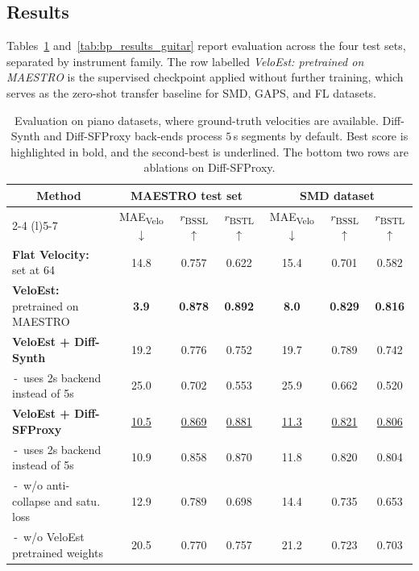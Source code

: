 \subsection{Results}
\label{ssec:bp:adapt_results}

Tables~\ref{tab:bp_results_piano} and~\ref{tab:bp_results_guitar} report evaluation across the four test sets, separated by instrument family. The row labelled \textit{VeloEst: pretrained on MAESTRO} is the supervised checkpoint applied without further training, which serves as the zero-shot transfer baseline for SMD, GAPS, and FL datasets.

\begin{table}[!b]
\caption{Evaluation on piano datasets, where ground-truth velocities are available. Diff-Synth and Diff-SFProxy back-ends process $5$\,s segments by default. Best score is highlighted in bold, and the second-best is underlined. The bottom two rows are ablations on Diff-SFProxy.}
\label{tab:bp_results_piano}
\centering
\setlength{\tabcolsep}{6pt} 
\fontsize{10pt}{13pt}\selectfont 
\renewcommand{\arraystretch}{1.2}
\begin{tabular}{l||ccc|ccc}
\toprule
\multicolumn{1}{c||}{\multirow{2}{*}{\textbf{Method}}}
& \multicolumn{3}{c|}{\textbf{MAESTRO test set}}
& \multicolumn{3}{c}{\textbf{SMD dataset}} \\
\cmidrule(lr){2-4} \cmidrule(l){5-7}
& MAE\textsubscript{Velo} $\downarrow$
& $r$\textsubscript{BSSL} $\uparrow$
& $r$\textsubscript{BSTL} $\uparrow$
& MAE\textsubscript{Velo} $\downarrow$
& $r$\textsubscript{BSSL} $\uparrow$
& $r$\textsubscript{BSTL} $\uparrow$ \\
\midrule
\textbf{Flat Velocity:} set at 64
& 14.8 & 0.757 & 0.622 & 15.4 & 0.701 & 0.582 \\
\textbf{VeloEst:} pretrained on MAESTRO
& \textbf{3.9} & \textbf{0.878} & \textbf{0.892}
& \textbf{8.0} & \textbf{0.829} & \textbf{0.816} \\
\textbf{VeloEst + Diff-Synth}
& 19.2 & 0.776 & 0.752 & 19.7 & 0.789 & 0.742 \\
\,-\, uses 2s backend instead of 5s
& 25.0 & 0.702 & 0.553 & 25.9 & 0.662 & 0.520 \\
\midrule
\textbf{VeloEst + Diff-SFProxy}
& \underline{10.5} & \underline{0.869} & \underline{0.881}
& \underline{11.3} & \underline{0.821} & \underline{0.806} \\
\,-\, uses 2s backend instead of 5s
& 10.9 & 0.858 & 0.870 & 11.8 & 0.820 & 0.804 \\
\,-\, w/o anti-collapse and satu. loss
& 12.9 & 0.789 & 0.698 & 14.4 & 0.735 & 0.653 \\
\,-\, w/o VeloEst pretrained weights
& 20.5 & 0.770 & 0.757 & 21.2 & 0.723 & 0.703 \\
\bottomrule
\end{tabular}
\end{table}


